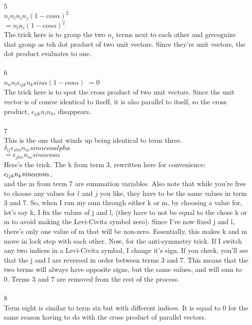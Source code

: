 \documentclass[prb,preprint]
{revtex4-1}
\begin{document}
5\\
$n_in_ln_in_j\left(1 - cos\alpha\right)^2$\\
$= n_l n_i \left(1 - cos\alpha\right)^2$\\
The trick here is to group the two $n_i$ terms next to each other and grecognize that group as teh dot product of two unit vectors.  Since they're unit vectors, the dot product evaluates to one.\\\\
6\\
$n_n n_l \epsilon_{ijk} n_k sin\alpha \left(1 - cos\alpha\right)$
$= 0$\\
The trick here is to spot the cross product of two unit vectors.  Since the unit vector is of course identical to itself, it is also parallel to itself, so the cross product, $\epsilon_{ijk}n_i n_k$, disappears.\\\\
7\\
This is the one that winds up being identical to term three.\\
$\delta_{ij} \epsilon_{ilm} n_m sin\alpha cos alpha$\\
$= \epsilon_{jlm} n_m sin \alpha cos \alpha$\\
Here's the trick.  The k from term 3, rewritten here for convenience: \\
$\epsilon_{ljk}n_k\space sin\alpha\space cos\alpha$, \\
and the m from term 7 are summation variables.  Also note that while you're free to choose any values for $l$ and $j$ you like, they have to be the same values in term 3 and 7.  So, when I run my sum through either k or m, by choosing a value for, let's say k, I fix the values of j and l, (they have to not be equal to the chose k or m to avoid making the Levi-Civita symbol zero).  Since I've now fixed j and l, there's only one value of m that will be non-zero.  Essentially, this makes k and m move in lock step with each other.  Now, for the anti-symmetry trick.  If I switch any two indices in a Levi-Civita symbol, I change it's sign.  If you check, you'll see that the j and l are reversed in order between terms 3 and 7.  This means that the two terms will always have opposite signs, but the same values, and will sum to 0.  Terms 3 and 7 are removed from the rest of the process.\\\\
8\\
Term eight is similar to term six but with different indices.  It is equal to 0 for the same reason having to do with the cross product of parallel vectors.\\\\
\end{document}
